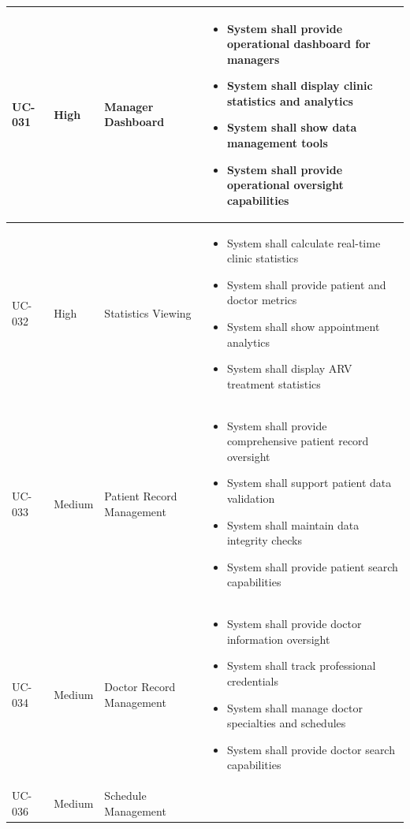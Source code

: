 \documentclass[12pt,a4paper]{article}
\begin{document}
\begin{longtable}{|p{1.2cm}|p{2.5cm}|p{3.5cm}|p{6.8cm}|}
\hline
UC-031 & High & Manager Dashboard & 
\begin{itemize}[leftmargin=*,topsep=1pt,partopsep=0pt,parsep=0pt,itemsep=1pt]
\item System shall provide operational dashboard for managers
\item System shall display clinic statistics and analytics
\item System shall show data management tools
\item System shall provide operational oversight capabilities
\end{itemize} \\
\hline
UC-032 & High & Statistics Viewing & 
\begin{itemize}[leftmargin=*,topsep=1pt,partopsep=0pt,parsep=0pt,itemsep=1pt]
\item System shall calculate real-time clinic statistics
\item System shall provide patient and doctor metrics
\item System shall show appointment analytics
\item System shall display ARV treatment statistics
\end{itemize} \\
\hline
UC-033 & Medium & Patient Record Management & 
\begin{itemize}[leftmargin=*,topsep=1pt,partopsep=0pt,parsep=0pt,itemsep=1pt]
\item System shall provide comprehensive patient record oversight
\item System shall support patient data validation
\item System shall maintain data integrity checks
\item System shall provide patient search capabilities
\end{itemize} \\
\hline
UC-034 & Medium & Doctor Record Management & 
\begin{itemize}[leftmargin=*,topsep=1pt,partopsep=0pt,parsep=0pt,itemsep=1pt]
\item System shall provide doctor information oversight
\item System shall track professional credentials
\item System shall manage doctor specialties and schedules
\item System shall provide doctor search capabilities
\end{itemize} \\
\hline
UC-036 & Medium & Schedule Management & 

\end{longtable}
\end{document}
